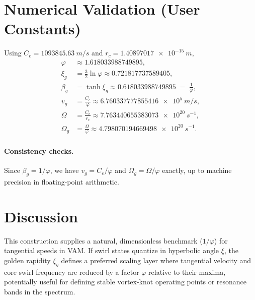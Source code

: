 \documentclass[11pt]{article}
\begin{document}
\section*{Numerical Validation (User Constants)}
Using $C_e=\SI{1093845.63}{m/s}$ and $r_c=\SI{1.40897017e-15}{m}$,
\begin{align}
  \varphi &\approx 1.618033988749895,\\
  \xi_g &= \tfrac{3}{2}\ln\varphi \approx 0.721817737589405,\\
  \beta_g &= \tanh\xi_g \approx 0.618033988749895 \;=\; \frac{1}{\varphi},\\
  v_g &= \frac{C_e}{\varphi} \approx \SI{6.760337777855416e5}{m/s},\\
  \Omega &= \frac{C_e}{r_c} \approx \SI{7.763440655383073e20}{s^{-1}},\\
  \Omega_g &= \frac{\Omega}{\varphi} \approx \SI{4.798070194669498e20}{s^{-1}}.
\end{align}

\paragraph{Consistency checks.}
Since $\beta_g=1/\varphi$, we have $v_g=C_e/\varphi$ and $\Omega_g=\Omega/\varphi$ exactly, up to machine precision in floating-point arithmetic.

\section*{Discussion}
This construction supplies a natural, dimensionless benchmark ($1/\varphi$) for tangential speeds in VAM. If swirl states quantize in hyperbolic angle $\xi$, the golden rapidity $\xi_g$ defines a preferred scaling layer where tangential velocity and core swirl frequency are reduced by a factor $\varphi$ relative to their maxima, potentially useful for defining stable vortex\hyp{}knot operating points or resonance bands in the spectrum.



\end{document}
